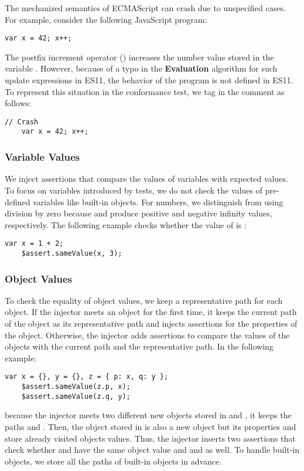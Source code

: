 The mechanized semantics of ECMAScript can crash due to unspecified cases.
For example, consider the following JavaScript program:
\begin{lstlisting}[style=myJSstyle]
    var x = 42; x++;
\end{lstlisting}
The postfix increment operator (\code{++}) increases the number value
stored in the variable .  However, because of a typo in the
\textbf{Evaluation} algorithm for such update expressions in ES11, the
behavior of the program is not defined in ES11.  To represent this situation in
the conformance test, we tag  in the comment as follows:
\begin{lstlisting}[style=myJSstyle]
    // Crash
    var x = 42; x++;
\end{lstlisting}


\subsubsection{Variable Values}

We inject assertions that compare the values of variables with expected values.
To focus on variables introduced by tests, we do not
check the values of pre-defined variables like built-in objects.
For numbers, we distinguish  from  using division by zero because  and
 produce positive and negative infinity values, respectively.
The following example checks whether the value of  is :
\begin{lstlisting}[style=myJSstyle]
    var x = 1 + 2;
    $assert.sameValue(x, 3);
\end{lstlisting}

\subsubsection{Object Values}

To check the equality of object values, we keep a representative path for each object.
If the injector meets an object for the first time, it keeps the current path of the object 
as its representative path and injects assertions for the properties of the object.
Otherwise, the injector adds assertions to compare the values of the
objects with the current path and the representative path.  In
the following example:
\begin{lstlisting}[style=myJSstyle]
    var x = {}, y = {}, z = { p: x, q: y };
    $assert.sameValue(z.p, x);
    $assert.sameValue(z.q, y);
\end{lstlisting}
because the injector meets two different new objects
stored in  and , it keeps the paths  and .
Then, the object stored in  is also a new object but its
properties  and  store already visited objects values.
Thus, the injector inserts two assertions that check whether  and  have
the same object value and  and  as well.
To handle built-in objects, we store all the paths of built-in objects in advance.


